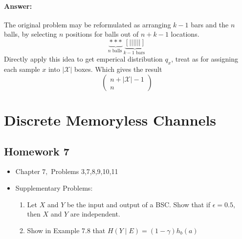 \documentclass[8pt]{article}
\begin{document}
\paragraph{Answer:}
The original problem may be reformulated as arranging $k-1$ bars and the $n$ balls, by selecting $n$ positions for balls out of $n+k-1$ locations.
$$
\underbrace{* * *}_{n \text { balls }}  \underbrace{[||||||]}_{k-1 \text { bars }}
$$
Directly apply this idea to get emperical distribution $q_x$, treat as for assigning each sample $x$ into $|\mathcal{X}|$ boxes. Which gives the result
$$\left(\begin{array}{c}n+|\mathcal{X}|-1 \\ n\end{array}\right)$$

\newpage
\section{Discrete Memoryless Channels}


\subsection{Homework 7}
\begin{itemize}
	\item Chapter $7,$ Problems 3,7,8,9,10,11
	\item Supplementary Problems:
	\begin{enumerate}
		\item Let $X$ and $Y$ be the input and output of a BSC. Show that if $\epsilon=0.5,$ then $X$ and $Y$ are independent.
		\item Show in Example 7.8 that $H(Y \mid E)=(1-\gamma) h_{b}(a)$
	\end{enumerate}
\end{itemize}
\end{document}
